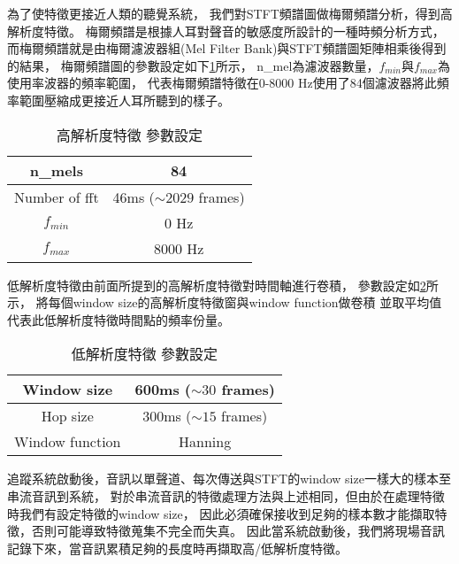 \documentclass[class=NCU_thesis, crop=false]{standalone}
\begin{document}
為了使特徵更接近人類的聽覺系統，
我們對STFT頻譜圖做梅爾頻譜分析，得到高解析度特徵。
梅爾頻譜是根據人耳對聲音的敏感度所設計的一種時頻分析方式，
而梅爾頻譜就是由梅爾濾波器組(Mel Filter Bank)與STFT頻譜圖矩陣相乘後得到的結果，
梅爾頻譜圖的參數設定如下\cref{table:table-high-resolution-feature-parameter-setting}所示，
n\_mel為濾波器數量，$f_{min}$與$f_{max}$為使用率波器的頻率範圍，
代表梅爾頻譜特徵在0-8000 Hz使用了84個濾波器將此頻率範圍壓縮成更接近人耳所聽到的樣子。

\begin{table}[h]
    \centering
    \caption{高解析度特徵 參數設定}
    \label{table:table-high-resolution-feature-parameter-setting}
    \begin{tabular}{|c|c|}
        \hline
        \multicolumn{1}{|c|}{n\_mels} & \multicolumn{1}{|c|}{84}\\
        \hline
        Number of fft & 46ms ($\sim 2029$ frames)\\
        \hline
        $f_{min}$ & 0 Hz \\
        \hline
        $f_{max}$ & 8000 Hz \\
        \hline
    \end{tabular}
\end{table}

低解析度特徵由前面所提到的高解析度特徵對時間軸進行卷積，
參數設定如\cref{table:table-low-resolution-feature-parameter-setting}所示，
將每個window size的高解析度特徵窗與window function做卷積
並取平均值代表此低解析度特徵時間點的頻率份量。

\begin{table}[h]
    \centering
    \caption{低解析度特徵 參數設定}
    \label{table:table-low-resolution-feature-parameter-setting}
    \begin{tabular}{|c|c|}
        \hline
        \multicolumn{1}{|c|}{Window size} & \multicolumn{1}{|c|}{600ms ($\sim 30$ frames)}\\
        \hline
        Hop size & 300ms ($\sim 15$ frames)\\
        \hline
        Window function & Hanning \\
        \hline
    \end{tabular}
\end{table}

追蹤系統啟動後，音訊以單聲道、每次傳送與STFT的window size一樣大的樣本至串流音訊到系統，
對於串流音訊的特徵處理方法與上述相同，但由於在處理特徵時我們有設定特徵的window size，
因此必須確保接收到足夠的樣本數才能擷取特徵，否則可能導致特徵蒐集不完全而失真。
因此當系統啟動後，我們將現場音訊記錄下來，當音訊累積足夠的長度時再擷取高/低解析度特徵。
\end{document}
